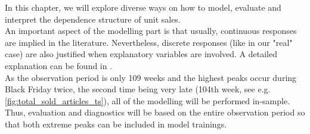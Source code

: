 
In this chapter, we will explore diverse ways on how to model, evaluate and interpret the dependence structure of unit sales. 
\\





An important aspect of the modelling part is that usually, continuous responses are implied in the literature. Nevertheless, discrete responses (like in our "real" case) are also justified when explanatory variables are involved. A detailed explanation can be found in \cite{trivedi2017note}.\\ 
As the observation period is only 109 weeks and the highest peaks occur during Black Friday twice, the second time being very late (104th week, see e.g. \autoref{fig:total_sold_articles_ts}), all of the modelling will be performed in-sample. Thus, evaluation and diagnostics will be based on the entire observation period so that both extreme peaks can be included in model trainings.


